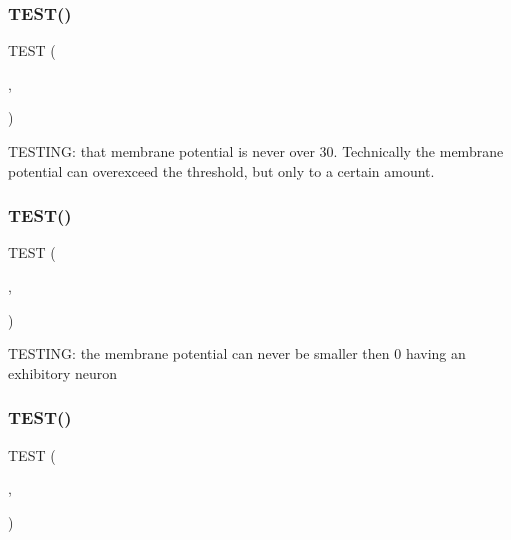 \mbox{\label{unittest_8cpp_ac8fffa2c41bf0fded308ea33cc99edc0}} 
\subsubsection{T\+E\+S\+T()\hspace{0.1cm}{\footnotesize\ttfamily [1/6]}}
{\footnotesize\ttfamily T\+E\+ST (\begin{DoxyParamCaption}\item[{Neuron\+Test}]{,  }\item[{Membrane\+Potential}]{ }\end{DoxyParamCaption})}

T\+E\+S\+T\+I\+NG\+: that membrane potential is never over 30. Technically the membrane potential can overexceed the threshold, but only to a certain amount. \mbox{\label{unittest_8cpp_a9ae3ddd73abc5bb7f258532c33b7823d}} 
\subsubsection{T\+E\+S\+T()\hspace{0.1cm}{\footnotesize\ttfamily [2/6]}}
{\footnotesize\ttfamily T\+E\+ST (\begin{DoxyParamCaption}\item[{Neuron\+Test}]{,  }\item[{Ex\+Membrane\+Potential}]{ }\end{DoxyParamCaption})}

T\+E\+S\+T\+I\+NG\+: the membrane potential can never be smaller then 0 having an exhibitory neuron \mbox{\label{unittest_8cpp_afb68d14b9cc6e43d7e865793296d636e}} 
\subsubsection{T\+E\+S\+T()\hspace{0.1cm}{\footnotesize\ttfamily [3/6]}}
{\footnotesize\ttfamily T\+E\+ST (\begin{DoxyParamCaption}\item[{Neuron\+Test}]{,  }\item[{Time\+Comparison}]{ }\end{DoxyParamCaption})}


